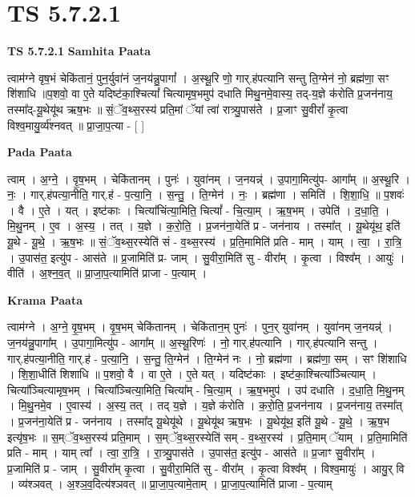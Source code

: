 \documentclass[17pt]{extarticle}
\begin{document}
\section{ TS 5.7.2.1 }

\textbf{TS 5.7.2.1 } \newline
\textbf{Samhita Paata} \newline

त्वाम॑ग्ने वृष॒भं चेकि॑तानं॒ पुन॒र्युवा॑नं ज॒नय॑न्नु॒पागां᳚ । अ॒स्थू॒रि णो॒ गार्.ह॑पत्यानि सन्तु ति॒ग्मेन॑ नो॒ ब्रह्म॑णा॒ सꣳ शि॑शाधि ॥प॒शवो॒ वा ए॒ते यदिष्ट॑का॒श्चित्यां᳚ चित्यामृष॒भमुप॑ दधाति मिथु॒नमे॒वास्य॒ तद्-य॒ज्ञे क॑रोति प्र॒जन॑नाय॒ तस्मा᳚द्-यू॒थेयू॑थ ऋष॒भः ॥ सं॒ॅव॒थ्स॒रस्य॑ प्रति॒मां ॅयां त्वा॑ रात्र्यु॒पास॑ते । प्र॒जाꣳ सु॒वीरां᳚ कृ॒त्वा विश्व॒मायु॒र्व्य॑श्नवत् ॥ प्रा॒जा॒प॒त्या - [  ] \newline

\textbf{Pada Paata} \newline

त्वाम् । अ॒ग्ने॒ । वृ॒ष॒भम् । चेकि॑तानम् । पुनः॑ । युवा॑नम् । ज॒नयन्न्॑ । उ॒पागा॒मित्यु॑प- आगा᳚म् ॥ अ॒स्थू॒रि । नः॒ । गार्.ह॑पत्या॒नीति॒ गार्.ह॑ - प॒त्या॒नि॒ । स॒न्तु॒ । ति॒ग्मेन॑ । नः॒ । ब्रह्म॑णा । समिति॑ । शि॒शा॒धि॒ ॥ प॒शवः॑ । वै । ए॒ते । यत् । इष्ट॑काः । चित्या᳚चिंत्या॒मिति॒ चित्यां᳚ - चि॒त्या॒म् । ऋ॒ष॒भम् । उपेति॑ । द॒धा॒ति॒ । मि॒थु॒नम् । ए॒व । अ॒स्य॒ । तत् । य॒ज्ञे । क॒रो॒ति॒ । प्र॒जन॑ना॒येति॑ प्र - जन॑नाय । तस्मा᳚त् । यू॒थेयू॑थ॒ इति॑ यू॒थे - यू॒थे॒ । ऋ॒ष॒भः ॥ सं॒ॅव॒थ्स॒रस्येति॑ सं - व॒थ्स॒रस्य॑ । प्र॒ति॒मामिति॑ प्रति - माम् । याम् । त्वा॒ । रा॒त्रि॒ । उ॒पास॑त॒ इत्यु॑प - आस॑ते ॥ प्र॒जामिति॑ प्र- जाम् । सु॒वीरा॒मिति॑ सु - वीरा᳚म् । कृ॒त्वा । विश्व᳚म् । आयुः॑ । वीति॑ । अ॒श्न॒व॒त् ॥ प्रा॒जा॒प॒त्यामिति॑ प्राजा - प॒त्याम् ।  \newline


\textbf{Krama Paata} \newline

त्वाम॑ग्ने । अ॒ग्ने॒ वृ॒ष॒भम् । वृ॒ष॒भम् चेकि॑तानम् । चेकि॑तान॒म् पुनः॑ । पुन॒र् युवा॑नम् । युवा॑नम् ज॒नयन्न्॑ । ज॒नय॑न्नु॒पागा᳚म् । उ॒पागा॒मित्यु॑प - आगा᳚म् ॥ अ॒स्थू॒रिणः॑ । नो॒ गार्.ह॑पत्यानि । गार्.ह॑पत्यानि सन्तु । गार्.ह॑पत्या॒नीति॒ गार्.ह॑ - प॒त्या॒नि॒ । स॒न्तु॒ ति॒ग्मेन॑ । ति॒ग्मेन॑ नः । नो॒ ब्रह्म॑णा । ब्रह्म॑णा॒ सम् । सꣳ शि॑शाधि । शि॒शा॒धीति॑ शिशाधि ॥ प॒शवो॒ वै । वा ए॒ते । ए॒ते यत् । यदिष्ट॑काः । इष्ट॑का॒श्चित्या᳚ञ्चित्याम् । चित्या᳚ञ्चित्यामृष॒भम् । चित्या᳚ञ्चित्या॒मिति॒ चित्या᳚म् - चि॒त्या॒म् । ऋ॒ष॒भमुप॑ । उप॑ दधाति । द॒धा॒ति॒ मि॒थु॒नम् । मि॒थु॒नमे॒व । ए॒वास्य॑ । अ॒स्य॒ तत् । तद् य॒ज्ञे । य॒ज्ञे क॑रोति । क॒रो॒ति॒ प्र॒जन॑नाय । प्र॒जन॑नाय॒ तस्मा᳚त् । प्र॒जन॑ना॒येति॑ प्र - जन॑नाय । तस्मा᳚द् यू॒थेयू॑थे । यू॒थेयू॑थ ऋष॒भः । यू॒थेयू॑थ॒ इति॑ यू॒थे - यू॒थे॒ । ऋ॒ष॒भ इत्यृ॑ष॒भः ॥ स॒म्ॅव॒थ्स॒रस्य॑ प्रति॒माम् । स॒म्ॅव॒थ्स॒रस्येति॑ सम् - व॒थ्स॒रस्य॑ । प्र॒ति॒माम् ॅयाम् । प्र॒ति॒मामिति॑ प्रति - माम् । याम् त्वा᳚ । त्वा॒ रा॒त्रि॒ । रा॒त्र्यु॒पास॑ते । उ॒पास॑त॒ इत्यु॑प - आस॑ते ॥ प्र॒जाꣳ सु॒वीरा᳚म् । प्र॒जामिति॑ प्र - जाम् । सु॒वीरा᳚म् कृ॒त्वा । सु॒वीरा॒मिति॑ सु - वीरा᳚म् । कृ॒त्वा विश्व᳚म् । विश्व॒मायुः॑ । आयु॒र् वि । व्य॑श्ञवत् । अ॒श्ञ॒व॒दित्य॑श्ञवत् ॥ प्रा॒जा॒प॒त्यामे॒ताम् । प्रा॒जा॒प॒त्यामिति॑ प्राजा - प॒त्याम् \newline
\end{document}

